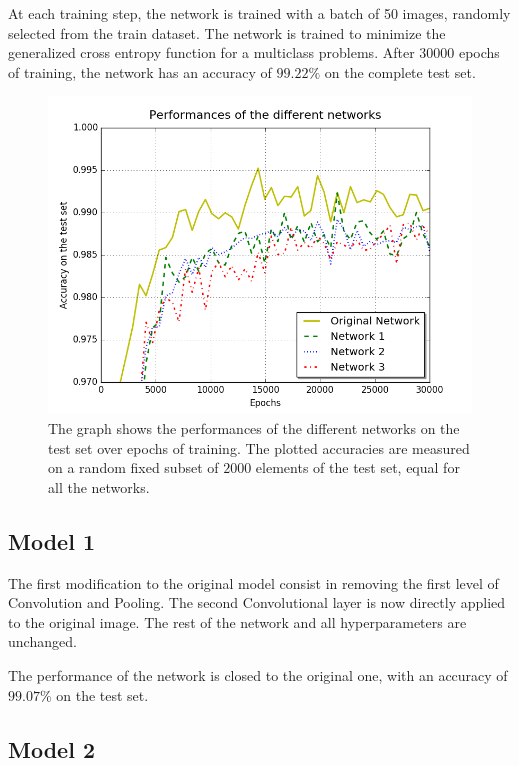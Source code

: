 At each training step, the network is trained with a batch of 50 images, randomly selected from the train dataset.
The network is trained to minimize the generalized cross entropy function for a multiclass problems.
After 30000 epochs of training, the network has an accuracy of $99.22\%$ on the complete test set.

\begin{figure}[t]
	\centering
	\includegraphics[width=\columnwidth]{figures/performances}
	\caption{The graph shows the performances of the different networks on the test set over epochs of training. The plotted accuracies are measured on a random fixed subset of $2000$ elements of the test set, equal for all the networks.}
	\label{fig:performances}
\end{figure}


\subsection{Model 1}

The first modification to the original model consist in removing the first level of Convolution and Pooling.
The second Convolutional layer is now directly applied to the original image.
The rest of the network and all hyperparameters are unchanged.

The performance of the network is closed to the original one, with an accuracy of $99.07\%$ on the test set.


\subsection{Model 2}

